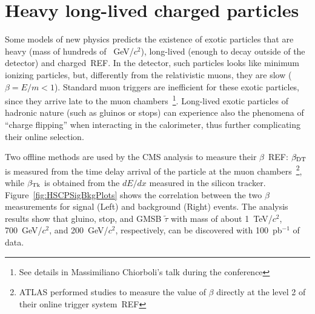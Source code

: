 \documentclass{cimento}
\begin{document}
\section{Heavy long-lived charged particles} \label{HSCP}
Some models of new physics 
predicts the existence of exotic particles that are 
heavy (mass of hundreds of ~GeV/$c^2$), long-lived
(enough to decay outside of the detector) and charged~REF. 
In the detector, such particles looks like 
minimum ionizing particles, but, differently from the 
relativistic muons, they are slow ($\beta=E/m<1$). 
Standard muon triggers are inefficient for these exotic particles, 
since they arrive late to the muon chambers~\footnote{See details 
in Massimiliano Chiorboli's talk during the conference}. 
Long-lived exotic particles of hadronic nature (such as gluinos or stops) 
can experience also the phenomena of ``charge flipping'' when interacting 
in the calorimeter, thus further complicating their online selection.

Two offline methods are used by the 
CMS analysis to measure their $\beta$~REF:
$\beta_{{\rm DT}}$ is measured from the time delay arrival of the particle
at the muon chambers~\footnote{ATLAS performed studies to measure 
the value of $\beta$ directly at the level 2 of their online 
trigger system~REF}, while $\beta_{{\rm Tk}}$ is obtained from the $dE/dx$ measured 
in the silicon tracker. Figure~\ref{fig:HSCPSigBkgPlots} 
shows the correlation between the two $\beta$ measurements for signal (Left) 
and background (Right) events. The analysis results show that 
gluino, stop, and GMSB $\tilde{\tau}$  with mass of about 
1~TeV/$c^2$, 700~GeV/$c^2$, and 200~GeV/$c^2$, 
respectively, can be discovered with 100~pb$^{-1}$ of data.
\end{document}
